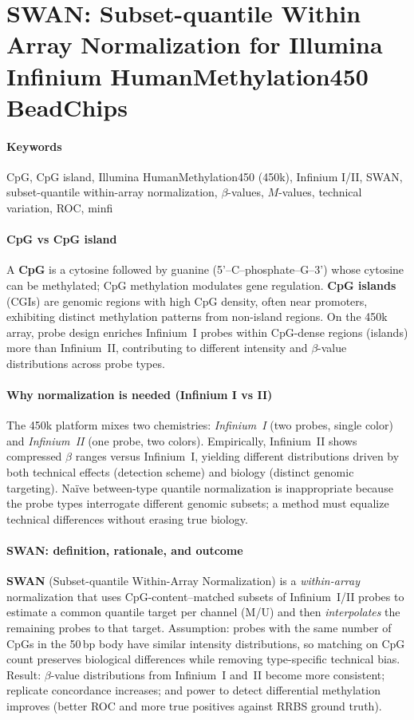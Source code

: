 \documentclass[10pt]{extarticle}
\begin{document}
\section{SWAN: Subset-quantile Within Array Normalization for Illumina Infinium HumanMethylation450 BeadChips}

\paragraph{Keywords}
CpG, CpG island, Illumina HumanMethylation450 (450k), Infinium I/II, SWAN, subset-quantile within-array normalization, $\beta$-values, $M$-values, technical variation, ROC, minfi \cite{Maksimovic2012SWAN}

\paragraph{CpG vs CpG island}
A \textbf{CpG} is a cytosine followed by guanine (5'–C–phosphate–G–3') whose cytosine can be methylated; CpG methylation modulates gene regulation. \textbf{CpG islands} (CGIs) are genomic regions with high CpG density, often near promoters, exhibiting distinct methylation patterns from non-island regions. On the 450k array, probe design enriches Infinium~I probes within CpG-dense regions (islands) more than Infinium~II, contributing to different intensity and $\beta$-value distributions across probe types.

\paragraph{Why normalization is needed (Infinium I vs II)}
The 450k platform mixes two chemistries: \textit{Infinium~I} (two probes, single color) and \textit{Infinium~II} (one probe, two colors). Empirically, Infinium~II shows compressed $\beta$ ranges versus Infinium~I, yielding different distributions driven by both technical effects (detection scheme) and biology (distinct genomic targeting). Naïve between-type quantile normalization is inappropriate because the probe types interrogate different genomic subsets; a method must equalize technical differences without erasing true biology.

\paragraph{SWAN: definition, rationale, and outcome}
\textbf{SWAN} (Subset-quantile Within-Array Normalization) is a \emph{within-array} normalization that uses CpG-content–matched subsets of Infinium~I/II probes to estimate a common quantile target per channel (M/U) and then \emph{interpolates} the remaining probes to that target. Assumption: probes with the same number of CpGs in the 50\,bp body have similar intensity distributions, so matching on CpG count preserves biological differences while removing type-specific technical bias. Result: $\beta$-value distributions from Infinium~I and~II become more consistent; replicate concordance increases; and power to detect differential methylation improves (better ROC and more true positives against RRBS ground truth).
\end{document}
